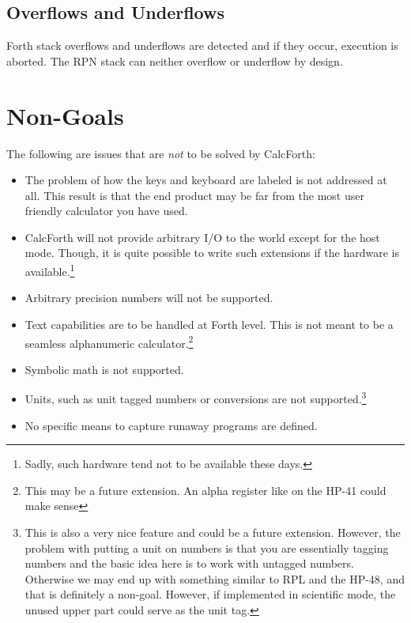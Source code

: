 \documentclass[a4paper]{article}
\begin{document}
\subsection{Overflows and Underflows}
Forth stack overflows and underflows are detected and if they occur, execution is aborted.  The RPN stack can neither overflow or underflow by design.

\section{Non-Goals}
The following are issues that are {\it not\/} to be solved by CalcForth:
\begin{itemize}
\item The problem of how the keys and keyboard are labeled is not addressed at all. This result is that the end product may be far from the most user friendly calculator you have used.
\item CalcForth will not provide arbitrary I/O to the world except for the host mode. Though, it is quite possible to write such extensions if the hardware is available.\footnote{Sadly, such hardware tend not to be available these days.}
\item Arbitrary precision numbers will not be supported.
\item Text capabilities are to be handled at Forth level. This is not meant to be a seamless alphanumeric calculator.\footnote{This may be a future extension. An alpha register like on the HP-41 could make sense}
\item Symbolic math is not supported.
\item Units, such as unit tagged numbers or conversions are not supported.\footnote{This is also a very nice feature and could be a future extension. However, the problem with putting a unit on numbers is that you are essentially tagging numbers and the basic idea here is to work with untagged numbers. Otherwise we may end up with something similar to RPL and the HP-48, and that is definitely a non-goal. However, if implemented in scientific mode, the unused upper part could serve as the unit tag.}
\item No specific means to capture runaway programs are defined.
\end{itemize}
\end{document}
